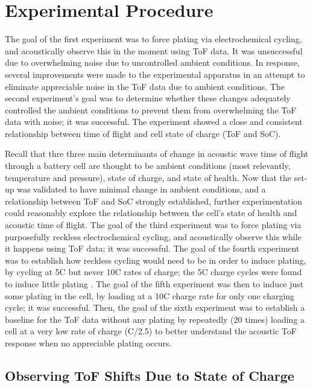 \chapter{Experimental Procedure}
The goal of the first experiment was to force plating via electrochemical cycling, and acoustically observe this in the moment using ToF data. It was unsuccessful due to overwhelming noise due to uncontrolled ambient conditions. In response, several improvements were made to the experimental apparatus in an attempt to eliminate appreciable noise in the ToF data due to ambient conditions. The second experiment's goal was to determine whether these changes adequately controlled the ambient conditions to prevent them from overwhelming the ToF data with noise; it was successful. The experiment showed a close and consistent relationship between time of flight and cell state of charge (ToF and SoC).

Recall that thre three main determinants of change in acoustic wave time of flight through a battery cell are thought to be ambient conditions (most relevantly, temperature and pressure), state of charge, and state of health. Now that the set-up was validated to have minimal change in ambient conditions, and a relationship between ToF and SoC strongly established, further experimentation could reasonably explore the relationship between the cell's state of health and acoustic time of flight. The goal of the third experiment was to force plating via purposefully reckless electrochemical cycling, and acoustically observe this while it happens using ToF data; it was successful. The goal of the fourth experiment was to establish how reckless cycling would need to be in order to induce plating, by cycling at 5C but never 10C rates of charge; the 5C charge cycles were found to induce little plating . The goal of the fifth experiment was then to induce just some plating in the cell, by loading at a 10C charge rate for only one charging cycle; it was successful. Then, the goal of the sixth experiment was to establish a baseline for the ToF data without any plating by repeatedly (20 times) loading a cell at a very low rate of charge (C/2.5) to better understand the acoustic ToF response when no appreciable plating occurs.

\section{Observing ToF Shifts Due to State of Charge}

